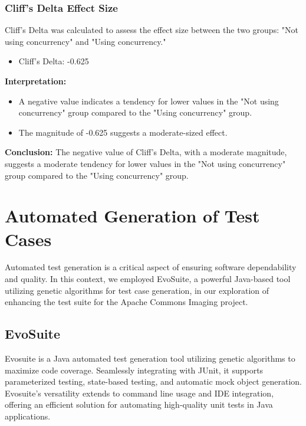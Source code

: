 \documentclass[sigconf]{acmart}
\begin{document}
\subsubsection{Cliff's Delta Effect Size}

Cliff's Delta was calculated to assess the effect size between the two groups: "Not using concurrency" and "Using concurrency."

\begin{itemize}
    \item Cliff's Delta: -0.625
\end{itemize}

\textbf{Interpretation:}
\begin{itemize}
    \item A negative value indicates a tendency for lower values in the "Not using concurrency" group compared to the "Using concurrency" group.
    \item The magnitude of -0.625 suggests a moderate-sized effect.
\end{itemize}

\textbf{Conclusion:}
The negative value of Cliff's Delta, with a moderate magnitude, suggests a moderate tendency for lower values in the "Not using concurrency" group compared to the "Using concurrency" group.



\section{Automated Generation of Test Cases}
Automated test generation is a critical aspect of ensuring software dependability and quality. In this context, we employed EvoSuite, a powerful Java-based tool utilizing genetic algorithms for test case generation, in our exploration of enhancing the test suite for the Apache Commons Imaging project.

\subsection{EvoSuite}
Evosuite\cite{evosuite} is a Java automated test generation tool utilizing genetic algorithms to maximize code coverage. Seamlessly integrating with JUnit, it supports parameterized testing, state-based testing, and automatic mock object generation. Evosuite's versatility extends to command line usage and IDE integration, offering an efficient solution for automating high-quality unit tests in Java applications.
\end{document}
